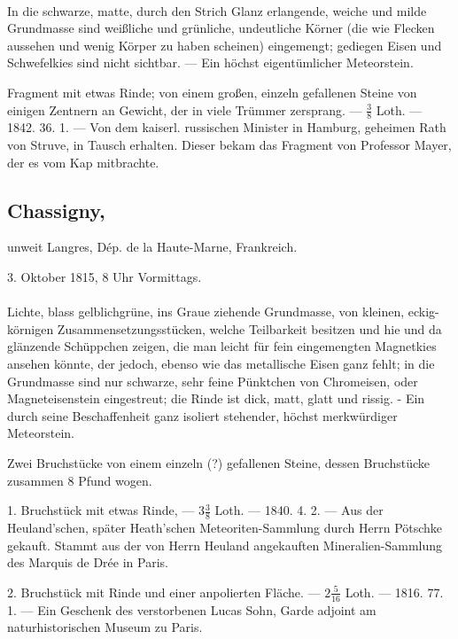 \documentclass[a4paper, 11pt, oneside, polutonikogreek, german]{article}
\begin{document}
\paragraph{}
In die schwarze, matte, durch den Strich Glanz erlangende, weiche und milde Grundmasse sind weißliche und grünliche, undeutliche Körner (die wie Flecken aussehen und wenig Körper zu haben scheinen) eingemengt; gediegen Eisen und Schwefelkies sind nicht sichtbar. — Ein höchst eigentümlicher Meteorstein.

Fragment mit etwas Rinde; von einem großen, einzeln gefallenen Steine von einigen Zentnern an Gewicht, der in viele Trümmer zersprang. — $\frac{3}{8}$ Loth. — 1842. 36. 1. — Von dem kaiserl. russischen Minister in Hamburg, geheimen Rath von Struve, in Tausch erhalten. Dieser bekam das Fragment von Professor Mayer, der es vom Kap mitbrachte.
\subsection[Chassigny.]{Chassigny,}
\begin{center}
\small
unweit Langres, Dép. de la Haute-Marne, Frankreich.

3. Oktober 1815, 8 Uhr Vormittags.
\end{center}
\paragraph{}
Lichte, blass gelblichgrüne, ins Graue ziehende Grundmasse, von kleinen, eckig-körnigen Zusammensetzungsstücken, welche Teilbarkeit besitzen und hie und da glänzende Schüppchen zeigen, die man leicht für fein eingemengten Magnetkies ansehen könnte, der jedoch, ebenso wie das metallische Eisen ganz fehlt; in die Grundmasse sind nur schwarze, sehr feine Pünktchen von Chromeisen, oder Magneteisenstein eingestreut; die Rinde ist dick, matt, glatt und rissig. - Ein durch seine Beschaffenheit ganz isoliert stehender, höchst merkwürdiger Meteorstein.

Zwei Bruchstücke von einem einzeln (?) gefallenen Steine, dessen Bruchstücke zusammen 8 Pfund wogen.

1. Bruchstück mit etwas Rinde, — $3\frac{3}{8}$ Loth. — 1840. 4. 2. — Aus der Heuland’schen, später Heath’schen Meteoriten-Sammlung durch Herrn Pötschke gekauft. Stammt aus der von Herrn Heuland angekauften Mineralien-Sammlung des Marquis de Drée in Paris.

2. Bruchstück mit Rinde und einer anpolierten Fläche. — $2\frac{5}{16}$ Loth. — 1816. 77. 1. — Ein Geschenk des verstorbenen Lucas Sohn, Garde adjoint am naturhistorischen Museum zu Paris.
\end{document}
